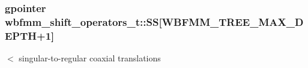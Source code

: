 \subsubsection[{S\+S}]{\setlength{\rightskip}{0pt plus 5cm}gpointer wbfmm\+\_\+shift\+\_\+operators\+\_\+t\+::\+S\+S[W\+B\+F\+M\+M\+\_\+\+T\+R\+E\+E\+\_\+\+M\+A\+X\+\_\+\+D\+E\+P\+T\+H+1]}\label{structwbfmm__shift__operators__t_a60f777706a8e58b89a18976d8fcc02c9}
$<$ singular-\/to-\/regular coaxial translations 